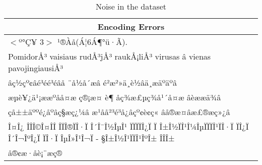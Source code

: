 \begin{table}[!htbp]
\vspace{0.5cm}

\begin{tabular}{|p{\textwidth}|}
\hline
\multicolumn{1}{|c|}{\textbf{Encoding Errors}} \\
\hline
$<$º°Ç¥ 3$>$ ¹®Àå(Á¦6Á¶°ü·Ã).\\
PomidorÅ³ vaisiaus rudÅ³jÅ³ raukÅ¡liÅ³ virusas â vienas pavojingiausiÅ³\\
âç½çº¢âé³éé³éâå ¨å½å´æâ é²æ²»ä¸è½âä¸æäºäºâ\\
æµè¥¿ä¹¡ææºåå¤æ ç®¡æ¤ è¶ åç¾æ£µç¾å¹´å¤æ âèææä¾â\\
çå±±äººé¿åºâç§æç¿¼â æ¹åå²³é³å¿âçº¢è¢ç« âå®æ¤âæ£®æç»¿â\\
Î¤Î¿ ÎÎÎ©Î¤ÎÎ ÎÏÎ®ÏÎ·Ï Î´Î¯Î½ÎµÎ¹ ÏÏÏÏÎ¿Ï Ï Î±Î½ÏÎ¹Î¼ÎµÏÏÏÎ¹ÏÎ·Ï ÏÎ¿Ï Î´Î¬ÎºÎ¿Ï ÏÎ·Ï ÎµÎ»Î¹Î¬Ï - §Î±Î½Î¹ÏÏÎ¹ÎºÎ± ÎÎÎ±\\
å®¢æ·åè¡¨æç®\\
\hline
\end{tabular}
\caption{Noise in the \VSI{} dataset}
\label{tab:04_noise}
\end{table}
